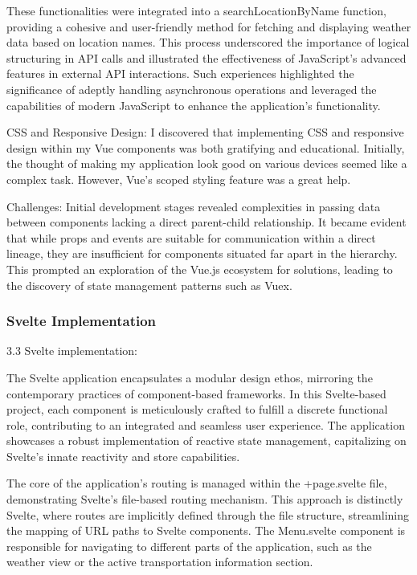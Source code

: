 These functionalities were integrated into a searchLocationByName function, providing a cohesive and user-friendly method for fetching and displaying weather data based on location names. This process underscored the importance of logical structuring in API calls and illustrated the effectiveness of JavaScript's advanced features in external API interactions. Such experiences highlighted the significance of adeptly handling asynchronous operations and leveraged the capabilities of modern JavaScript to enhance the application's functionality.

CSS and Responsive Design:
I discovered that implementing CSS and responsive design within my Vue components was both gratifying and educational. Initially, the thought of making my application look good on various devices seemed like a complex task. However, Vue's scoped styling feature was a great help. 

Challenges: 
Initial development stages revealed complexities in passing data between components lacking a direct parent-child relationship. It became evident that while props and events are suitable for communication within a direct lineage, they are insufficient for components situated far apart in the hierarchy. This prompted an exploration of the Vue.js ecosystem for solutions, leading to the discovery of state management patterns such as Vuex. 

\subsubsection*{Svelte Implementation}
3.3 Svelte implementation:

The Svelte application encapsulates a modular design ethos, mirroring the contemporary practices of component-based frameworks. In this Svelte-based project, each component is meticulously crafted to fulfill a discrete functional role, contributing to an integrated and seamless user experience. The application showcases a robust implementation of reactive state management, capitalizing on Svelte's innate reactivity and store capabilities.

The core of the application's routing is managed within the +page.svelte file, demonstrating Svelte's file-based routing mechanism. This approach is distinctly Svelte, where routes are implicitly defined through the file structure, streamlining the mapping of URL paths to Svelte components. The Menu.svelte component is responsible for navigating to different parts of the application, such as the weather view or the active transportation information section.

